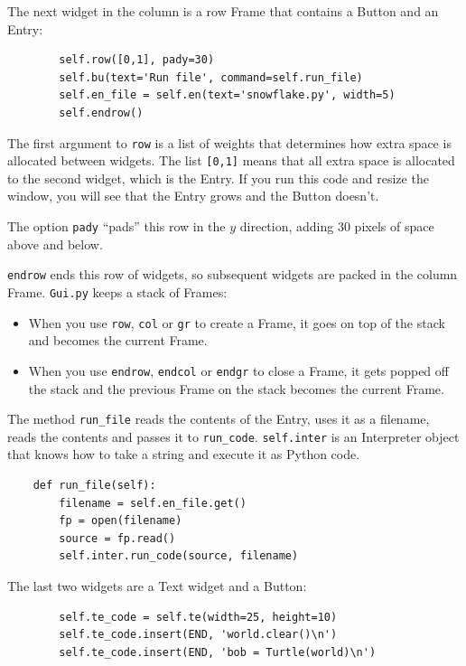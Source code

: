 \documentclass[10pt]{book}
\begin{document}
{The next widget in the column is a row Frame that contains
a Button and an Entry:

\beforeverb
\begin{verbatim}
        self.row([0,1], pady=30)
        self.bu(text='Run file', command=self.run_file)
        self.en_file = self.en(text='snowflake.py', width=5)
        self.endrow()
\end{verbatim}
\afterverb
%
The first argument to {\tt row} is a list of weights that
determines how extra space is allocated between widgets.  
The list {\tt [0,1]} means that all extra space is allocated
to the second widget, which is the Entry.  If you run this code
and resize the window, you will see that the Entry grows and
the Button doesn't.

The option {\tt pady} ``pads'' this row in the $y$ direction,
adding 30 pixels of space above and below.

{\tt endrow} ends this row of widgets, so subsequent widgets are
packed in the column Frame.  {\tt Gui.py} keeps a stack of Frames:

\begin{itemize}

\item When you use {\tt row}, {\tt col} or {\tt gr} to create a Frame,
it goes on top of the stack and becomes the current Frame.

\item When you use {\tt endrow}, {\tt endcol} or {\tt endgr} to close
a Frame, it gets popped off the stack and the previous Frame on the
stack becomes the current Frame.

\end{itemize} 

The method \verb"run_file" reads the contents of the Entry,
uses it as a filename, reads the contents
and passes it to \verb"run_code".  {\tt self.inter} is an
Interpreter object that knows how to take a string and
execute it as Python code.

\beforeverb
\begin{verbatim}
    def run_file(self):
        filename = self.en_file.get()
        fp = open(filename)
        source = fp.read()
        self.inter.run_code(source, filename)
\end{verbatim}
\afterverb
%
The last two widgets are a Text widget and a Button:

\beforeverb
\begin{verbatim}
        self.te_code = self.te(width=25, height=10)
        self.te_code.insert(END, 'world.clear()\n')
        self.te_code.insert(END, 'bob = Turtle(world)\n')


\end{verbatim}}
\end{document}
